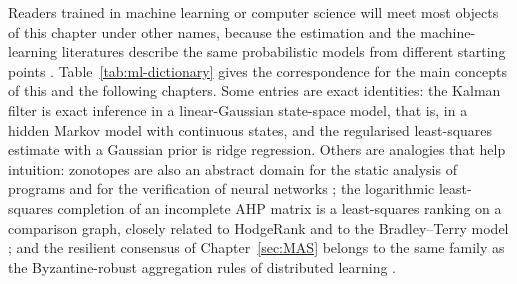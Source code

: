 \begin{addedblock}
Readers trained in machine learning or computer science will meet most objects of this chapter under other names, because the estimation and the machine-learning literatures describe the same probabilistic models from different starting points \cite{bishop2006_prml,koller2009_pgm,sarkka2013_bayesian}. Table~\ref{tab:ml-dictionary} gives the correspondence for the main concepts of this and the following chapters. Some entries are exact identities: the Kalman filter is exact inference in a linear-Gaussian state-space model, that is, in a hidden Markov model with continuous states, and the regularised least-squares estimate with a Gaussian prior is ridge regression. Others are analogies that help intuition: zonotopes are also an abstract domain for the static analysis of programs and for the verification of neural networks \cite{ghorbal2009_zonotope,gehr2018_ai2}; the logarithmic least-squares completion of an incomplete AHP matrix is a least-squares ranking on a comparison graph, closely related to HodgeRank and to the Bradley--Terry model \cite{jiang2011_hodgerank,bradley1952_paired}; and the resilient consensus of Chapter~\ref{sec:MAS} belongs to the same family as the Byzantine-robust aggregation rules of distributed learning \cite{yin2018_byzantine}.


\end{addedblock}
